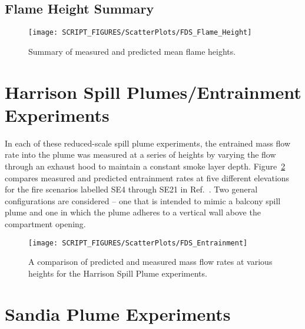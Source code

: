 \clearpage

\subsection{Flame Height Summary}
\label{Flame Height}


\begin{figure}[!h]
\begin{center}
\texttt{[image: SCRIPT\_FIGURES/ScatterPlots/FDS\_Flame\_Height]} 
\end{center}
\caption[Summary of flame height predictions]
{Summary of measured and predicted mean flame heights.}
\label{Flame_Height_Scatterplot}
\end{figure}




\clearpage

\section{Harrison Spill Plumes/Entrainment Experiments}
\label{Harrison_Spill_Plumes}
\label{Entrainment}

In each of these reduced-scale spill plume experiments, the entrained mass flow rate into the plume was measured at a series of heights by varying the flow through an exhaust hood to maintain a constant smoke layer depth.  Figure~\ref{Entrainment_Plot} compares measured and predicted entrainment rates at five different elevations for the fire scenarios labelled SE4 through SE21 in Ref.~\cite{Harrison:2009}. Two general configurations are considered -- one that is intended to mimic a balcony spill plume and one in which the plume adheres to a vertical wall above the compartment opening.

\begin{figure}[h]
\begin{center}
\texttt{[image: SCRIPT\_FIGURES/ScatterPlots/FDS\_Entrainment]}
\caption[Summary of plume entrainment predictions]{A comparison of predicted and measured mass flow rates at various heights for the Harrison Spill Plume experiments.}
\label{Entrainment_Plot}
\end{center}
\end{figure}




\clearpage

\section{Sandia Plume Experiments}

